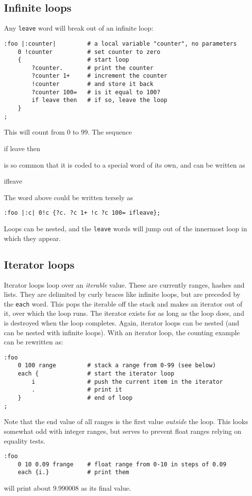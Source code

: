 \subsection{Infinite loops}
Any \texttt{leave} word will break out of an infinite loop:
\begin{lstlisting}
:foo |:counter|         # a local variable "counter", no parameters
    0 !counter          # set counter to zero
    {                   # start loop
        ?counter.       # print the counter
        ?counter 1+     # increment the counter
        !counter        # and store it back
        ?counter 100=   # is it equal to 100?
        if leave then   # if so, leave the loop
    }
;
\end{lstlisting}
This will count from 0 to 99. The sequence
\begin{v}
if leave then
\end{v}
is so common that it is coded to a special word of its own, and can be written
as 
\begin{v}
ifleave
\end{v}
The word above could be written tersely as
\begin{lstlisting}
:foo |:c| 0!c {?c. ?c 1+ !c ?c 100= ifleave};
\end{lstlisting}
Loops can be nested, and the \texttt{leave} words will jump out of the
innermost loop in which they appear.

\subsection{Iterator loops}
Iterator loops loop over an \emph{iterable} value. These are currently ranges,
hashes and lists. They are delimited by curly braces like infinite loops,
but are preceded by the 
\texttt{each} word. This pops the iterable off the stack and makes an
iterator out of it, over which the loop runs. The iterator exists for as 
long as the loop does, and is destroyed when the loop completes. Again, iterator
loops can be nested (and can be nested with infinite loops). With an iterator
loop, the counting example can be rewritten as:
\begin{lstlisting}
:foo
    0 100 range         # stack a range from 0-99 (see below)
    each {              # start the iterator loop
        i               # push the current item in the iterator
        .               # print it
    }                   # end of loop
;
\end{lstlisting}
Note that the end value of all ranges is the first value \emph{outside} the loop.
This looks somewhat odd with integer ranges, but serves to prevent float ranges
relying on equality tests.
\begin{lstlisting}
:foo
    0 10 0.09 frange    # float range from 0-10 in steps of 0.09
    each {i.}           # print them
\end{lstlisting}
will print about 9.990008 as its final value.

